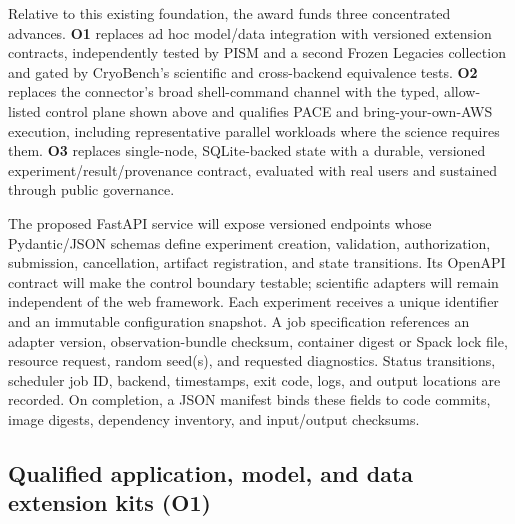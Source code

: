 Relative to this existing foundation, the award funds three concentrated
advances. \textbf{O1} replaces ad hoc model/data integration with versioned
extension contracts, independently tested by PISM and a second Frozen
Legacies collection and gated by CryoBench's scientific and cross-backend
equivalence tests. \textbf{O2} replaces the connector's broad shell-command
channel with the typed, allow-listed control plane shown above and qualifies
PACE and bring-your-own-AWS execution, including representative parallel
workloads where the science requires them. \textbf{O3} replaces single-node,
SQLite-backed state with a durable, versioned experiment/result/provenance
contract, evaluated with real users and sustained through public governance.

The proposed FastAPI service will expose versioned endpoints whose
Pydantic/JSON schemas define experiment creation, validation, authorization,
submission, cancellation, artifact registration, and state transitions. Its
OpenAPI contract will make the control boundary testable; scientific adapters
will remain independent of the web framework. Each experiment receives a unique identifier and
an immutable configuration snapshot. A job specification references an
adapter version, observation-bundle checksum, container digest or Spack lock
file, resource request, random seed(s), and requested diagnostics. Status
transitions, scheduler job ID, backend, timestamps, exit code, logs, and output
locations are recorded. On completion, a JSON manifest binds these fields to
code commits, image digests, dependency inventory, and input/output checksums.

\subsection{Qualified application, model, and data extension kits (\textbf{O1})}

